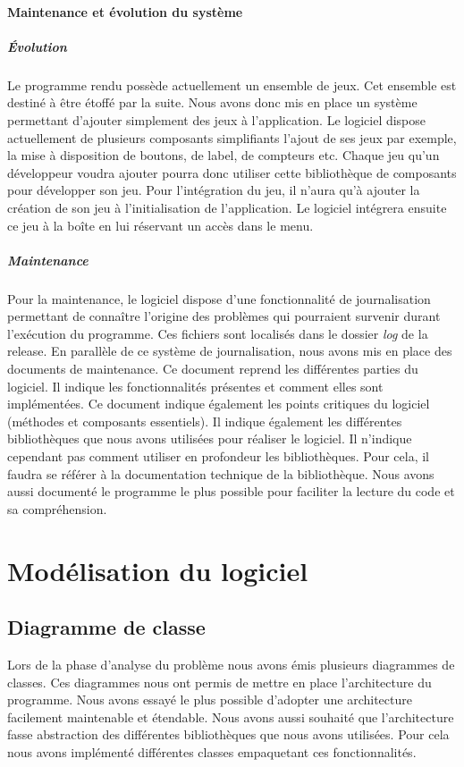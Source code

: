 \documentclass{polytech/polytech}
\begin{document}
\subsubsection{Maintenance et évolution du système}
\paragraph{Évolution}
Le programme rendu possède actuellement un ensemble de jeux. Cet ensemble est destiné à être étoffé par la suite. Nous avons donc mis en place un système permettant d'ajouter simplement des jeux à l'application. Le logiciel dispose actuellement de plusieurs composants simplifiants l'ajout de ses jeux par exemple, la mise à disposition  de boutons, de label, de compteurs etc. Chaque jeu qu'un développeur voudra ajouter pourra donc utiliser cette bibliothèque de composants pour développer son jeu. Pour l'intégration du jeu, il n'aura qu'à ajouter la création de son jeu à l'initialisation de l'application. Le logiciel intégrera ensuite ce jeu à la boîte en lui réservant un accès dans le menu. 

\paragraph{Maintenance}
Pour la maintenance, le logiciel dispose d'une fonctionnalité de journalisation permettant de connaître l'origine des problèmes qui pourraient survenir durant l'exécution du programme. Ces fichiers sont localisés dans le dossier \textit{log} de la release. 
En parallèle de ce système de journalisation, nous avons mis en place des documents de  maintenance. Ce document reprend les différentes parties du logiciel. Il indique les fonctionnalités présentes et comment elles sont implémentées. Ce document indique également les points critiques du logiciel (méthodes et composants essentiels). Il indique également les différentes bibliothèques que nous avons utilisées pour réaliser le logiciel. Il n'indique cependant pas comment utiliser en profondeur les bibliothèques. Pour cela, il faudra se référer à la documentation technique de la bibliothèque. 
Nous avons aussi documenté le programme le plus possible pour faciliter la lecture du code et sa compréhension. 

\chapter{Modélisation du logiciel}
\section{Diagramme de classe}
Lors de la phase d'analyse du problème nous avons émis plusieurs diagrammes de classes. Ces diagrammes nous ont permis de mettre en place l'architecture du programme. Nous avons essayé le plus possible d'adopter une architecture facilement maintenable et étendable. Nous avons aussi souhaité que l'architecture fasse abstraction des différentes bibliothèques que nous avons utilisées. Pour cela nous avons implémenté différentes classes empaquetant ces fonctionnalités. 
\end{document}
